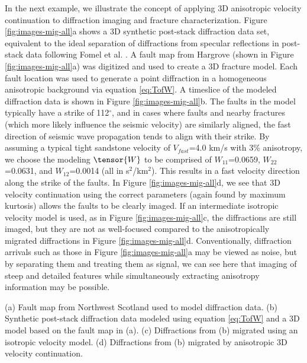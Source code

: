 In the next example, we illustrate the concept of applying 3D
anisotropic velocity continuation to diffraction imaging and fracture
characterization.  
Figure \ref{fig:images-mig-all}a shows a 3D synthetic
post-stack diffraction data set, equivalent to the ideal separation of
diffractions from specular reflections in post-stack data following 
Fomel et al. \cite{fomel_landa_taner07}.  
A fault map from Hargrove \cite{hargrove10} (shown in Figure \ref{fig:images-mig-all}a) was digitized and used to create a 3D fracture model.  
Each fault location was used to generate a point diffraction in a homogeneous anisotropic
background via equation \ref{eq:TofW}. 
A timeslice of the modeled diffraction data is shown in Figure \ref{fig:images-mig-all}b.
The faults in the model typically have a strike of 112$^{\circ }$, and
in cases where faults and nearby fractures (which more likely influence the seismic velocity) 
are similarly aligned, the fast direction of
seismic wave propagation tends to align with their strike.  
By assuming a typical tight sandstone velocity of $V_{fast}$=4.0 km/s with 3\%
anisotropy, we choose the modeling $\tensor{W}$ to be comprised of
$W_{11}$=0.0659, $W_{22}$=0.0631, and $W_{12}$=0.0014 (all in s$^2$/km$^2$).  
This results in a fast velocity direction along the strike of the faults.
In Figure \ref{fig:images-mig-all}d, we see that 3D velocity continuation using the
correct parameters (again found by maximum kurtosis) allows the faults
to be clearly imaged.  
If an intermediate isotropic velocity model is used, as in Figure \ref{fig:images-mig-all}c, 
the diffractions are still imaged, but they are not as well-focused compared to 
the anisotropically migrated diffractions in Figure \ref{fig:images-mig-all}d.
Conventionally, diffraction arrivals such as
those in Figure \ref{fig:images-mig-all}a may be viewed as noise, but by
separating them and treating them as signal, we can see here that
imaging of steep and detailed features while simultaneously extracting
anisotropy information may be possible.

{(a) Fault map from Northwest Scotland \cite{hargrove10} used to model diffraction data. (b) Synthetic post-stack diffraction data modeled using equation \ref{eq:TofW} and a 3D model based on the fault map in (a).  (c) Diffractions from (b) migrated using an isotropic velocity model.  (d) Diffractions from (b) migrated by anisotropic 3D velocity continuation.}


